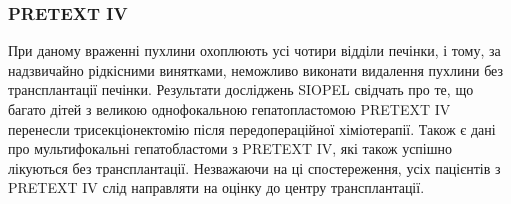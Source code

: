 \subsubsection{PRETEXT IV}
При даному враженні пухлини охоплюють усі чотири відділи печінки, і тому, за надзвичайно рідкісними винятками, неможливо виконати видалення пухлини без трансплантації печінки. Результати досліджень SIOPEL свідчать про те, що багато дітей з великою однофокальною гепатопластомою PRETEXT IV перенесли трисекціонектомію після передопераційної хіміотерапії. Також є дані про мультифокальні гепатобластоми з PRETEXT IV, які також успішно лікуються без трансплантації. Незважаючи на ці спостереження, усіх пацієнтів з PRETEXT IV слід направляти на оцінку до центру трансплантації.

\begin{table}[]
\caption{Субкласифікація PRETEXT}
\label{table:subPRETEXT}
\centering
{}
\end{table}




